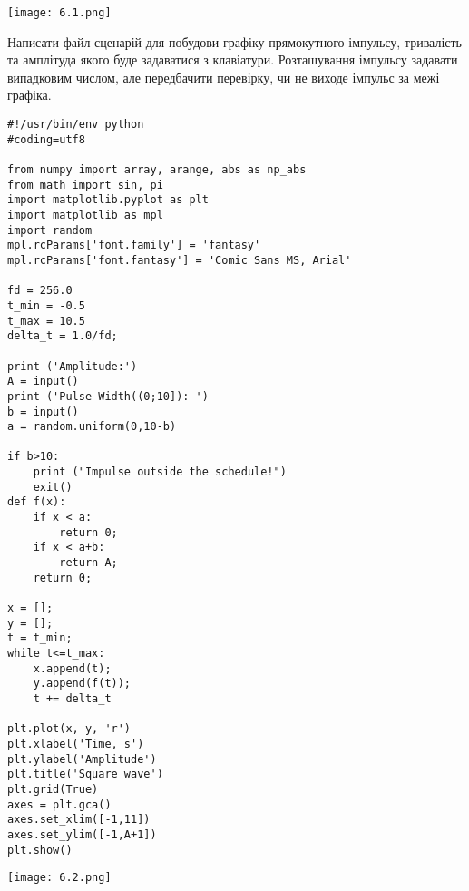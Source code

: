 \documentclass[a4paper,12pt]{article}
\begin{document}
\begin{center}
\texttt{[image: 6.1.png]}
\end{center}
 Написати файл-сценарій для побудови графіку прямокутного імпульсу, тривалість та амплітуда якого буде задаватися з клавіатури. Розташування імпульсу задавати випадковим числом, але передбачити перевірку, чи не виходе імпульс за межі графіка.
\lstset{language=Python}
\begin{lstlisting}
#!/usr/bin/env python
#coding=utf8

from numpy import array, arange, abs as np_abs
from math import sin, pi
import matplotlib.pyplot as plt
import matplotlib as mpl
import random
mpl.rcParams['font.family'] = 'fantasy'
mpl.rcParams['font.fantasy'] = 'Comic Sans MS, Arial'

fd = 256.0
t_min = -0.5
t_max = 10.5
delta_t = 1.0/fd;

print ('Amplitude:')
A = input()
print ('Pulse Width((0;10]): ')
b = input()
a = random.uniform(0,10-b)

if b>10:
	print ("Impulse outside the schedule!")
	exit()
def f(x):
    if x < a:
        return 0;
    if x < a+b:
        return A;
    return 0;

x = [];
y = [];
t = t_min;
while t<=t_max:
    x.append(t);
    y.append(f(t));
    t += delta_t
 
plt.plot(x, y, 'r')
plt.xlabel('Time, s')
plt.ylabel('Amplitude')
plt.title('Square wave')
plt.grid(True)
axes = plt.gca()
axes.set_xlim([-1,11])
axes.set_ylim([-1,A+1])
plt.show()
\end{lstlisting}
\begin{center}
\texttt{[image: 6.2.png]}
\end{center}
\end{document}
